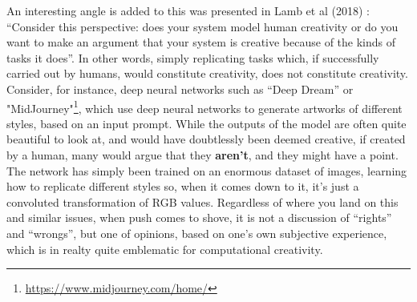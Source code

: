 An interesting angle is added to this was presented in Lamb et al (2018) \cite{LambCarolyn2018ECCA}: “Consider this perspective: does your system model human creativity or do you want to make an argument that your system is creative because of the kinds of tasks it does”. In other words, simply replicating tasks which, if successfully carried out by humans, would constitute creativity, does not constitute creativity. Consider, for instance, deep neural networks such as “Deep Dream” \cite{DeepDream2015} or "MidJourney"\footnote{\url{https://www.midjourney.com/home/}}, which use deep neural networks to generate artworks of different styles, based on an input prompt. While the outputs of the model are often quite beautiful to look at, and would have doubtlessly been deemed creative, if created by a human, many would argue that they \textbf{aren't}, and they might have a point. The network has simply been trained on an enormous dataset of images, learning how to replicate different styles so, when it comes down to it, it’s just a convoluted transformation of RGB values. Regardless of where you land on this and similar issues, when push comes to shove, it is not a discussion of “rights” and “wrongs”, but one of opinions, based on one's own subjective experience, which is in realty quite emblematic for computational creativity.